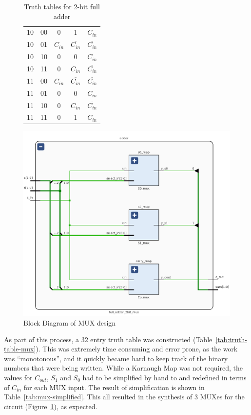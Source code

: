 \documentclass{article}
\begin{document}
\begin{table}[H]
\begin{subfigure}{0.4\linewidth}
\begin{tabular}{c c | c c c}
            10  & 00  & 0         & 1                   & $C_{in}$            \\
            10  & 01  & $C_{in}$  & $\overline{C_{in}}$ & $\overline{C_{in}}$ \\
            10  & 10  & 0         & 0                   & $C_{in}$            \\
            10  & 11  & 0         & $C_{in}$            & $\overline{C_{in}}$ \\
            11  & 00  & $C_{in}$  & $\overline{C_{in}}$ & $\overline{C_{in}}$ \\
            11  & 01  & 0         & 0                   & $C_{in}$            \\
            11  & 10  & 0         & $C_{in}$            & $\overline{C_{in}}$ \\
            11  & 11  & 0         & 1                   & $C_{in}$            \\
            \bottomrule
        \end{tabular}
    \end{subfigure}
    \caption{Truth tables for 2-bit full adder}
\end{table}

\begin{figure}[h]
    \centering
    \includegraphics[width=0.5\linewidth]{mux-schematic.png}
    \caption{Block Diagram of MUX design}
    \label{fig:mux-schematic}
\end{figure}

As part of this process, a 32 entry truth table was constructed (Table~\ref{tab:truth-table-mux}).
This was extremely time consuming and error prone, as the work was ``monotonous'', and it quickly became hard to keep track
of the binary numbers that were being written. While a Karnaugh Map was not required,
the values for $C_{out}$, $S_1$ and $S_0$ had to be simplified by hand to and redefined in terms of $C_{in}$ for each MUX input.
The result of simplification is shown in Table~\ref{tab:mux-simplified}.
This all resulted in the synthesis of 3 MUXes for the circuit (Figure~\ref{fig:mux-schematic}), as expected.
\end{document}
